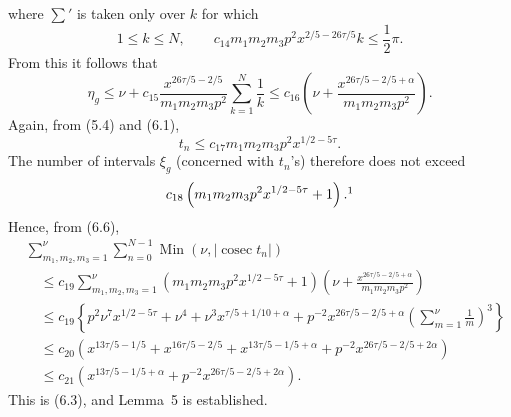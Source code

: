 \documentclass[11pt]{article}
\newcommand{\cosec}{\operatorname{cosec}}
\newcommand{\Min}{\operatorname{Min}}
\begin{document}
where $\sum'$ is taken only over $k$ for which
\[
 1\leq k\leq N,\qquad
 c_{14}m_1m_2m_3p^2x^{2/5-26\tau/5}k\leq\frac12\pi.
\]
From this it follows that
\begin{equation}
 \eta_g\leq\nu+c_{15}\frac{x^{26\tau/5-2/5}}{m_1m_2m_3p^2}
 \sum_{k=1}^{N}\frac1k
 \leq c_{16}\left(\nu+
 \frac{x^{26\tau/5-2/5+\alpha}}{m_1m_2m_3p^2}\right).
 \tag{6.6}
\end{equation}
Again, from (5.4) and (6.1),
\[
 t_n\leq c_{17}m_1m_2m_3p^2x^{1/2-5\tau}.
\]
The number of intervals $\xi_g$ (concerned with $t_n$'s) therefore does not
exceed
\[
 c_{18}\left(m_1m_2m_3p^2x^{1/2-5\tau}+1\right).\footnotemark
\]
Hence, from (6.6),
\begin{align*}
&\sum_{m_1,m_2,m_3=1}^{\nu}\sum_{n=0}^{N-1}
 \Min\left(\nu,|\cosec t_n|\right) \\
&\quad\leq c_{19}\sum_{m_1,m_2,m_3=1}^{\nu}
 \left(m_1m_2m_3p^2x^{1/2-5\tau}+1\right)
 \left(\nu+\frac{x^{26\tau/5-2/5+\alpha}}{m_1m_2m_3p^2}\right) \\
&\quad\leq c_{19}\left\{p^2\nu^7x^{1/2-5\tau}+\nu^4
 +\nu^3x^{\tau/5+1/10+\alpha}
 +p^{-2}x^{26\tau/5-2/5+\alpha}
 \left(\sum_{m=1}^{\nu}\frac1m\right)^3\right\} \\
&\quad\leq c_{20}\left(x^{13\tau/5-1/5}+x^{16\tau/5-2/5}
 +x^{13\tau/5-1/5+\alpha}
 +p^{-2}x^{26\tau/5-2/5+2\alpha}\right) \\
&\quad\leq c_{21}\left(x^{13\tau/5-1/5+\alpha}
 +p^{-2}x^{26\tau/5-2/5+2\alpha}\right).
\end{align*}
This is (6.3), and Lemma~5 is established.
\end{document}
